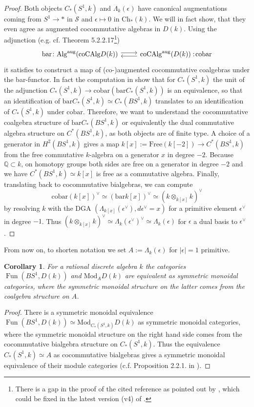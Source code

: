 \documentclass[10pt, reqno]{amsart}
\newtheorem{corollary}[theorem]{Corollary}
\theoremstyle{definition}
\theoremstyle{remark}
\newcommand{\Q}{\mathbb{Q}}
\newcommand{\CAlg}{\mathrm{CAlg}}
\newcommand{\Alg}{\mathrm{Alg}}
\newcommand{\Spc}{\mathcal{S}}
\newcommand{\co}{\mathrm{co}}
\renewcommand{\bar}{\mathrm{bar}}
\newcommand{\Ch}{\mathrm{Ch}}
\newcommand{\aug}{\mathrm{aug}}
\newcommand{\Free}{\mathrm{Free}}
\newcommand{\Mod}{\mathrm{Mod}}
\DeclareMathOperator{\Fun}{\mathrm{Fun}}
\begin{document}
\begin{proof}
	Both objects $C_*(S^1,k)$ and $\Lambda_k(\epsilon)$ have canonical augmentations coming from $S^1\to *$ in $\Spc$ and $\epsilon\mapsto 0$ in $\Ch_*(k)$. We will in fact show, that they even agree as augmented cocommutative algebras in $D(k)$.
	Using the adjunction (e.g. cf. \cite{Lur16} Theorem 5.2.2.17\footnote{There is a gap in the proof of the cited reference as pointed out by \cite{DH22}, which could be fixed in the latest version (v4) of \cite{BCN23}.})
	\[\begin{tikzcd}\bar\colon\Alg^\aug(\co\CAlg D(k))\ar[r, shift left = 1]&\co\CAlg^\aug (D(k)):\!\co\bar\ar[l, shift left=1]\end{tikzcd}\] 
	 it satisfies to construct a map of (co-)augmented cocommutative coalgebras under the bar-functor. In fact the computation in \cite{Ada56} show that for $C_*(S^1,k)$ the unit of the adjunction $C_*(S^1,k)\to\co\bar(\bar C_*(S^1,k))$ is an equivalence, so that an identification of $\bar C_*(S^1,k)\simeq C_*(BS^1,k)$ translates to an identification of $C_*(S^1,k)$ under $\co\bar$. Therefore, we want to understand the cocommutative coalgebra structure of $\bar C_*(BS^1,k)$ or equivalently the dual commutative algebra structure on $C^*(BS^1,k)$, as both objects are of finite type. 
	A choice of a generator in $H^2(BS^1,k)$ gives a map $k[x]:=\Free(k[-2])\to C^*(BS^1,k)$ from the free commutative $k$-algebra on a generator $x$ in degree $-2$. Because $\Q\subset k$, on homotopy groups both sides are free on a generator in degree $-2$ and we have $C^*(BS^1,k)\simeq k[x]$ is free as a commutative algebra. Finally, translating back to cocommutative bialgebras, we can compute
	\[\co\bar (k[x])^\vee\simeq(\bar k[x])^\vee\simeq \left(k\otimes_{k[x]} k\right)^\vee\]
	by resolving $k$ with the DGA $(\Lambda_{k[x]}(\epsilon^\vee), d\epsilon^\vee=x)$ for a primitive element $\epsilon^\vee$ in degree $-1$. Thus $\left(k\otimes_{k[x]} k\right)^\vee\simeq\Lambda_k(\epsilon^\vee)^\vee\simeq\Lambda_k(\epsilon)$ for $\epsilon$ a dual basis to $\epsilon^\vee$.
\end{proof}

From now on, to shorten notation we set $A:=\Lambda_k(\epsilon)$ for $|\epsilon|=1$ primitive.

\begin{corollary}\label{formalaction}
	For a rational discrete algebra $k$ the categories $\Fun(BS^1,D(k))$ and $\Mod_{A}D(k)$ are equivalent as symmetric monoidal categories, where the symmetric monoidal structure on the latter comes from the coalgebra structure on $A$.
\end{corollary}
\begin{proof}
	There is a symmetric monoidal equivalence $\Fun(BS^1,D(k))\simeq \Mod_{C_*(S^1,k)}D(k)$ as symmetric monoidal categories, where the symmetric monoidal structure on the right hand side comes from the cocommutative bialgebra structure on $C_*(S^1,k)$. Thus the equivalence $C_*(S^1,k)\simeq A$ as cocommutative bialgebras gives a symmetric monoidal equivalence of their module categories (c.f. Proposition 2.2.1. in \cite{Rak20}).
\end{proof}
\end{document}

